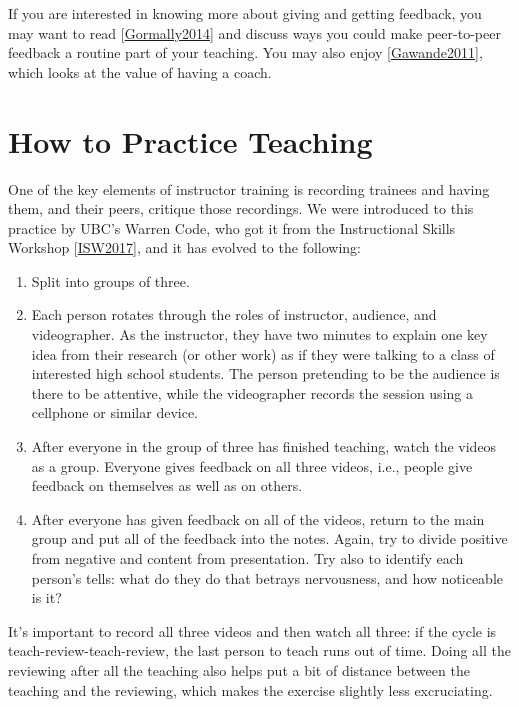 \documentclass[10pt,statementpaper]{memoir}
\begin{document}
If you are interested in knowing more about giving and getting feedback,
you may want to read
{[}\href{biblio.html\#gormally-teaching-feedback}{Gormally2014}{]} and
discuss ways you could make peer-to-peer feedback a routine part of your
teaching. You may also enjoy
{[}\href{biblio.html\#gawande-personal-best}{Gawande2011}{]}, which
looks at the value of having a coach.

\section{How to Practice Teaching}\label{how-to-practice-teaching}

One of the key elements of instructor training is recording trainees and
having them, and their peers, critique those recordings. We were
introduced to this practice by UBC's Warren Code, who got it from the
Instructional Skills Workshop
{[}\href{biblio.html\#isw-resources}{ISW2017}{]}, and it has evolved to
the following:

\begin{enumerate}
\def\labelenumi{\arabic{enumi}.}
\item
  Split into groups of three.
\item
  Each person rotates through the roles of instructor, audience, and
  videographer. As the instructor, they have two minutes to explain one
  key idea from their research (or other work) as if they were talking
  to a class of interested high school students. The person pretending
  to be the audience is there to be attentive, while the videographer
  records the session using a cellphone or similar device.
\item
  After everyone in the group of three has finished teaching, watch the
  videos as a group. Everyone gives feedback on all three videos, i.e.,
  people give feedback on themselves as well as on others.
\item
  After everyone has given feedback on all of the videos, return to the
  main group and put all of the feedback into the notes. Again, try to
  divide positive from negative and content from presentation. Try also
  to identify each person's tells: what do they do that betrays
  nervousness, and how noticeable is it?
\end{enumerate}

It's important to record all three videos and then watch all three: if
the cycle is teach-review-teach-review, the last person to teach runs
out of time. Doing all the reviewing after all the teaching also helps
put a bit of distance between the teaching and the reviewing, which
makes the exercise slightly less excruciating.
\end{document}

